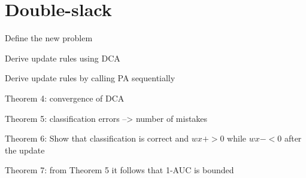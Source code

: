 \section{Double-slack}

Define the new problem

Derive update rules using DCA

Derive update rules by calling PA sequentially 

Theorem 4: convergence of DCA

Theorem 5: classification errors --> number of mistakes

Theorem 6: Show that classification is correct and $ w x+ >0$ while $w x- < 0$ after the update

Theorem 7: from Theorem 5 it follows that 1-AUC is bounded
